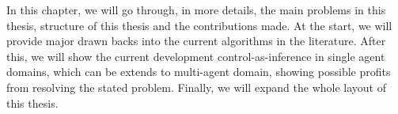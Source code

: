 \label{chapter:intro}
\begin{miniabstract}
    In this chapter, we will go through, in more details, the main problems in this thesis, structure of this thesis and the contributions made. At the start, we will provide major drawn backs into the current algorithms in the literature. After this, we will show the current development control-as-inference in single agent domains, which can be extends to multi-agent domain, showing possible profits from resolving the stated problem. Finally, we will expand the whole layout of this thesis.
\end{miniabstract}
